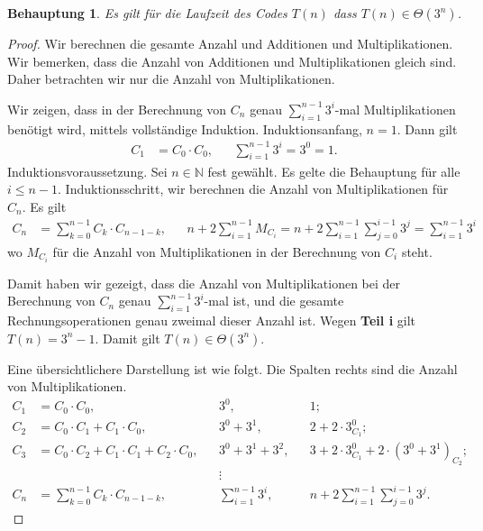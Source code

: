 \documentclass[draft,a5paper]{article}
\newtheorem*{beh}{Behauptung}
\begin{document}
\begin{beh}
  Es gilt für die Laufzeit des Codes \(T(n)\) dass
  \(T(n) \in \Theta(3^{n})\).
\end{beh}

\begin{proof}
  Wir berechnen die gesamte Anzahl und Additionen und
  Multiplikationen.  Wir bemerken, dass die Anzahl von Additionen und
  Multiplikationen gleich sind.  Daher betrachten wir nur die Anzahl
  von Multiplikationen.

  Wir zeigen, dass in der Berechnung von \(C_{n}\) genau
  \(\sum_{i=1}^{n-1}{3^{i}}\)-mal Multiplikationen benötigt wird, mittels
  vollständige Induktion.  Induktionsanfang, \(n=1\).  Dann gilt
  \begin{align*}
    C_{1} &= C_{0} \cdot C_{0}, &&\sum_{i=1}^{n-1}{3^{i}} = 3^{0} = 1.
  \end{align*}
  Induktionsvoraussetzung.  Sei \(n \in \mathbb{N}\) fest gewählt.  Es gelte die
  Behauptung für alle \(i \le n - 1\).  Induktionsschritt, wir berechnen die
  Anzahl von Multiplikationen für \(C_{n}\).  Es gilt
  \begin{align*}
    C_{n} &= \sum_{k=0}^{n-1}{C_{k} \cdot C_{n-1-k}},
    &&n+2\sum_{i=1}^{n-1}{M_{C_{i}}} =
       n+2\sum_{i=1}^{n-1}{\sum_{j=0}^{i-1}{3^{j}}}
       = \sum_{i=1}^{n-1}{3^{i}}
  \end{align*}
  wo \(M_{C_{i}}\) für die Anzahl von Multiplikationen in der
  Berechnung von \(C_{i}\) steht.

  Damit haben wir gezeigt, dass die Anzahl von Multiplikationen bei
  der Berechnung von \(C_{n}\) genau \(\sum_{i=1}^{n-1}{3^{i}}\)-mal ist,
  und die gesamte Rechnungsoperationen genau zweimal dieser Anzahl
  ist.  Wegen \textbf{Teil i} gilt \(T(n) = 3^{n} - 1\). Damit gilt
  \(T(n) \in \Theta(3^{n})\).

  Eine übersichtlichere Darstellung ist wie folgt.  Die Spalten rechts
  sind die Anzahl von Multiplikationen.
  \begin{align*}
    C_{1} &= C_{0} \cdot C_{0}, &&3^{0}, &&1;\\
    C_{2} &= C_{0} \cdot C_{1} + C_{1} \cdot C_{0},
                            &&3^{0} + 3^{1},
                                     &&2 + 2 \cdot 3^{0}_{C_{1}}; \\
    C_{3} &= C_{0} \cdot C_{2} + C_{1} \cdot C_{1} + C_{2} \cdot C_{0},
                            &&3^{0} + 3^{1} + 3^{2},
                               &&3 + 2 \cdot 3^{0}_{C_{1}} + 2 \cdot
                                  (3^{0}+3^{1})_{C_{2}};\\
          & &&\vdots &&\\
    C_{n} &= \sum_{k=0}^{n-1}{C_{k} \cdot C_{n-1-k}}, &&\sum_{i=1}^{n-1}{3^{i}}, &&n+2\sum_{i=1}^{n-1}{\sum_{j=0}^{i-1}{3^{j}}}.
  \end{align*}
\end{proof}
\end{document}
